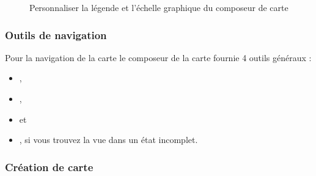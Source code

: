 {\begin{figure}[ht]
\centering
\caption{Personnaliser la légende et l'échelle graphique du composeur de carte
\nixcaption}\label{fig:print_composer_tab1}
    \goodgap
\end{figure}

\subsubsection{Outils de navigation}

Pour la navigation de la carte le composeur de la carte fournie 4 outils
généraux :

\begin{itemize}
\item {},
\item {},
\item {} et
\item {}, si vous trouvez la vue dans
un état incomplet.
\end{itemize}

\subsubsection{Création de carte}

}
